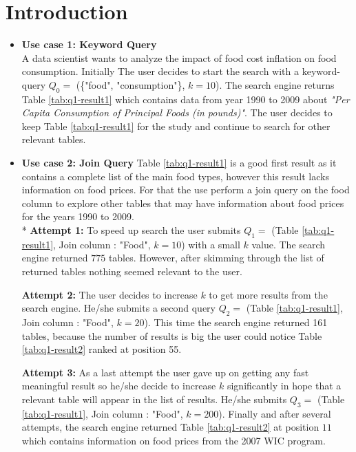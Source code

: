 \section{Introduction}
\label{sec:introduction}

\begin{itemize}
	\item \textbf{Use case 1: Keyword Query}\\
	 A data scientist wants to analyze the impact of food cost inflation on food consumption. Initially  The user decides to start the search with a keyword-query $Q_{0} = $  (\{"food", "consumption"\}, $k = 10$). The search engine returns Table \ref{tab:q1-result1} which contains data from year 1990 to 2009 about {\it "Per Capita Consumption of Principal Foods (in pounds)"}. The user decides to keep Table \ref{tab:q1-result1} for the study and continue to search for other relevant tables. %
	
	\item \textbf{Use case 2: Join Query}
	Table \ref{tab:q1-result1} is a good first result as it contains a complete list of the main food types, however this result lacks information on food prices. For that the use perform a join query on the food column to explore other tables that may have information about food prices for the years 1990 to 2009. \\*
	\textbf{Attempt 1:} To speed up search the user submits $Q_{1} =$ (Table \ref{tab:q1-result1}, Join column : "Food", $k = 10$) with a small $k$ value. The search engine returned $775$ tables. However, after skimming through the list of returned tables nothing seemed relevant to the user. 
	
	\textbf{Attempt 2:} The user decides to increase $k$ to get more results from the search engine. He/she submits a second query $Q_{2} =$ (Table \ref{tab:q1-result1}, Join column : "Food", $k = 20$). This time the search engine returned 161 tables, because the number of results is big the user could notice Table \ref{tab:q1-result2} ranked at position 55.
	
	\textbf{Attempt 3:} As a last attempt the user gave up on getting any fast meaningful result so he/she decide to increase $k$ significantly in hope that a relevant table will appear in the list of results. He/she submits $Q_{3} =$ (Table \ref{tab:q1-result1}, Join column : "Food", $k = 200$). Finally and after several attempts, the search engine returned Table \ref{tab:q1-result2} at position $11$ which contains information on food prices from the 2007 WIC program. %


\end{itemize}
